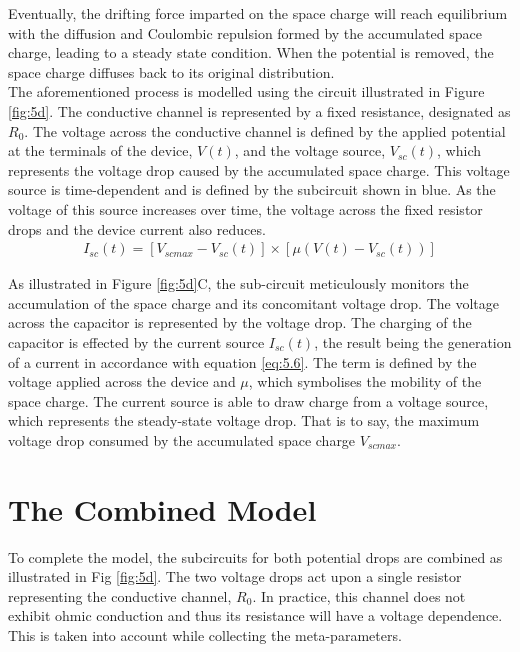 \noindent Eventually, the drifting force imparted on the space charge will reach equilibrium with the diffusion and Coulombic repulsion formed by the accumulated space charge, leading to a steady state condition. When the potential is removed, the space charge diffuses back to its original distribution. \\

\noindent The aforementioned process is modelled using the circuit illustrated in Figure \ref{fig:5d}. The conductive channel is represented by a fixed resistance, designated as $R_0$. The voltage across the conductive channel is defined by the applied potential at the terminals of the device, $V(t)$, and the voltage source, $V_{sc}(t)$, which represents the voltage drop caused by the accumulated space charge. This voltage source is time-dependent and is defined by the subcircuit shown in blue. As the voltage of this source increases over time, the voltage across the fixed resistor drops and the device current also reduces.
\begin{align}
I_{sc}(t) = \left[ V_{scmax} - V_{sc}(t) \right] \times \left[ \mu \left( V(t) - V_{sc}(t) \right) \right] \label{eq:5.6} 
\end{align}

\noindent As illustrated in Figure \ref{fig:5d}C, the sub-circuit meticulously monitors the accumulation of the space charge and its concomitant voltage drop. The voltage across the capacitor is represented by the voltage drop. The charging of the capacitor is effected by the current source $I_{sc}(t)$, the result being the generation of a current in accordance with equation \ref{eq:5.6}. The term is defined by the voltage applied across the device and $\mu$, which symbolises the mobility of the space charge. The current source is able to draw charge from a voltage source, which represents the steady-state voltage drop. That is to say, the maximum voltage drop consumed by the accumulated space charge $V_{scmax}$.

\section[The Combined Model]{The Combined Model}

\noindent To complete the model, the subcircuits for both potential drops are combined as illustrated in Fig \ref{fig:5d}. The two voltage drops act upon a single resistor representing the conductive channel, $R_0$. In practice, this channel does not exhibit ohmic conduction and thus its resistance will have a voltage dependence. This is taken into account while collecting the meta-parameters.

